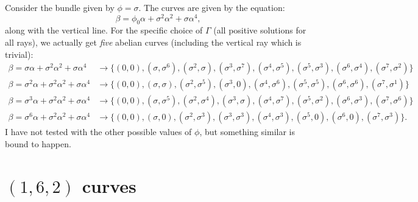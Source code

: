\documentclass[a4paper]{article}
\begin{document}
  Consider the bundle given by $\phi = \sigma$. The curves
  are given by the equation:
  \begin{equation}
    \beta = \phi_0 \alpha + \sigma^2 \alpha^2 + \sigma
    \alpha^{4},
  \end{equation}
  along with the vertical line. For the specific choice of
  $\Gamma$ (all positive solutions for all rays), we
  actually get \textit{five} abelian curves (including the
  vertical ray which is trivial):
  \begin{align}
    \beta = \sigma \alpha + \sigma^2 \alpha^2 + \sigma
    \alpha^{4} 
    &\to \{
      (0,0), (\sigma,\sigma^6), (\sigma^2,\sigma),
      (\sigma^3,\sigma^{7}), (\sigma^{4},\sigma^{5}),
      (\sigma^{5}, \sigma^{3}), (\sigma^{6},\sigma^{4}),
      (\sigma^{7}, \sigma^2)
    \} \\
    \beta = \sigma^2 \alpha + \sigma^2 \alpha^2 + \sigma
    \alpha^{4}
    &\to \{
      (0,0), (\sigma,\sigma), (\sigma^2,\sigma^{5}),
      (\sigma^3,0), (\sigma^{4},\sigma^{6}),
      (\sigma^{5}, \sigma^{5}), (\sigma^{6},\sigma^{6}),
      (\sigma^{7}, \sigma^1)
    \} \\
    \beta = \sigma^3 \alpha + \sigma^2 \alpha^2 + \sigma
    \alpha^{4} 
    &\to \{
      (0,0), (\sigma,\sigma^5), (\sigma^2,\sigma^{4}),
      (\sigma^3,\sigma), (\sigma^{4},\sigma^{7}),
      (\sigma^{5}, \sigma^{2}), (\sigma^{6},\sigma^{3}),
      (\sigma^{7}, \sigma^6)
    \} \\
    \beta = \sigma^6 \alpha + \sigma^2 \alpha^2 + \sigma
    \alpha^{4} 
    &\to \{
      (0,0), (\sigma,0), (\sigma^2,\sigma^{3}),
      (\sigma^3,\sigma^3), (\sigma^{4},\sigma^{3}),
      (\sigma^{5}, 0), (\sigma^{6},0),
      (\sigma^{7}, \sigma^3)
    \}.
  \end{align}
  I have not tested with the other possible values of
  $\phi$, but something similar is bound to happen.

  \section{$(1,6,2)$ curves}
\end{document}
